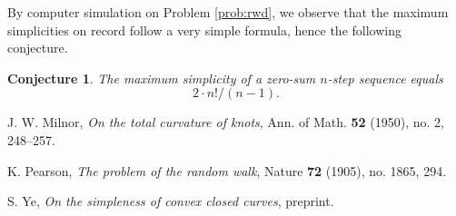 \documentclass{amsart}
\newtheorem{conjecture}[proposition]{Conjecture}
\theoremstyle{definition}
\theoremstyle{problem}
\theoremstyle{remark}
\begin{document}
By computer simulation on Problem \ref{prob:rwd}, we observe that the maximum
simplicities on record follow a very simple formula, hence the following conjecture.

\begin{conjecture}
    \label{con:value_formula}
    The maximum simplicity of a zero-sum $n$-step sequence
    equals \[2\cdot n!/(n-1).\]
\end{conjecture}

\begin{thebibliography}{9}

    J. W. Milnor,
    \emph{On the total curvature of knots},
    Ann. of Math.
    \textbf{52} (1950), no. 2, 248--257.

    K. Pearson,
    \emph{The problem of the random walk},
    Nature \textbf{72} (1905), no. 1865, 294.

    S. Ye,
    \emph{On the simpleness of convex closed curves},
    preprint.

\end{thebibliography}
\end{document}
